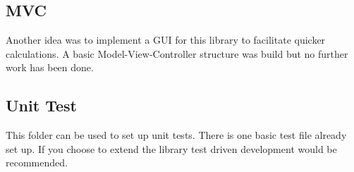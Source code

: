 \documentclass{article}
\begin{document}
    \subsection{MVC}
        Another idea was to implement a GUI for this library to facilitate quicker calculations. A basic Model-View-Controller structure was build but no further work has been done.
    \subsection{Unit Test}
        This folder can be used to set up unit tests. There is one basic test file already set up. If you choose to extend the library test driven development would be recommended.

        
\end{document}
